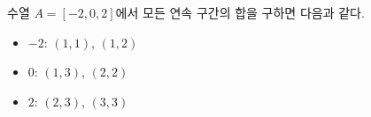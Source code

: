 수열 $A = [-2, 0, 2]$에서 모든 연속 구간의 합을 구하면 다음과 같다.

\begin{itemize}
    \item $-2$: $(1, 1)$, $(1, 2)$
    \item $0$: $(1, 3)$, $(2, 2)$
    \item $2$: $(2, 3)$, $(3, 3)$
\end{itemize}